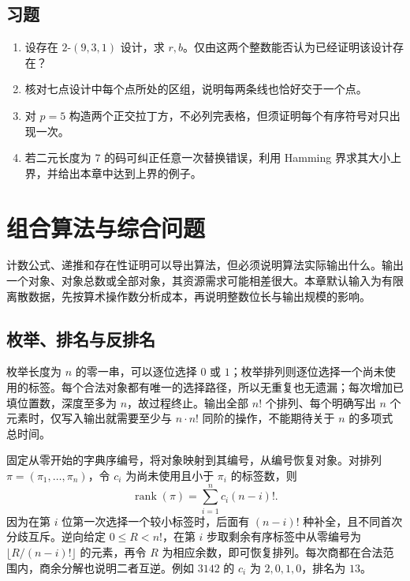 \documentclass[UTF8,12pt,a4paper,fontset=fandol]{ctexbook}
\begin{document}
\section{习题}
\begin{enumerate}
  \item\label{ex:designs-codes-1} 设存在 $2$-$(9,3,1)$ 设计，求 $r,b$。仅由这两个整数能否认为已经证明该设计存在？
  \item\label{ex:designs-codes-2} 核对七点设计中每个点所处的区组，说明每两条线也恰好交于一个点。
  \item\label{ex:designs-codes-3} 对 $p=5$ 构造两个正交拉丁方，不必列完表格，但须证明每个有序符号对只出现一次。
  \item\label{ex:designs-codes-4} 若二元长度为 $7$ 的码可纠正任意一次替换错误，利用 Hamming 界求其大小上界，并给出本章中达到上界的例子。
\end{enumerate}

\chapter{组合算法与综合问题}
\label{ch:algorithms}

计数公式、递推和存在性证明可以导出算法，但必须说明算法实际输出什么。输出一个对象、对象总数或全部对象，其资源需求可能相差很大。本章默认输入为有限离散数据，先按算术操作数分析成本，再说明整数位长与输出规模的影响。

\section{枚举、排名与反排名}

枚举长度为 $n$ 的零一串，可以逐位选择 $0$ 或 $1$；枚举排列则逐位选择一个尚未使用的标签。每个合法对象都有唯一的选择路径，所以无重复也无遗漏；每次增加已填位置数，深度至多为 $n$，故过程终止。输出全部 $n!$ 个排列、每个明确写出 $n$ 个元素时，仅写入输出就需要至少与 $n\cdot n!$ 同阶的操作，不能期待关于 $n$ 的多项式总时间。

固定从零开始的字典序编号，将对象映射到其编号，从编号恢复对象。对排列 $\pi=(\pi_1,\ldots,\pi_n)$，令 $c_i$ 为尚未使用且小于 $\pi_i$ 的标签数，则
\[
 \operatorname{rank}(\pi)=\sum_{i=1}^n c_i(n-i)!.
\]
因为在第 $i$ 位第一次选择一个较小标签时，后面有 $(n-i)!$ 种补全，且不同首次分歧互斥。逆向给定 $0\le R<n!$，在第 $i$ 步取剩余有序标签中从零编号为 $\lfloor R/(n-i)!\rfloor$ 的元素，再令 $R$ 为相应余数，即可恢复排列。每次商都在合法范围内，商余分解也说明二者互逆。例如 $3142$ 的 $c_i$ 为 $2,0,1,0$，排名为 $13$。
\end{document}
